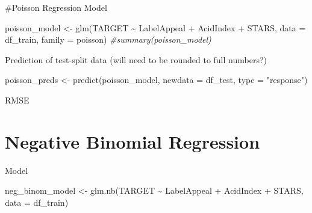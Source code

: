 \documentclass[
]{article}
\newenvironment{Shaded}{\begin{snugshade}}{\end{snugshade}}
\newcommand{\AttributeTok}[1]{\textcolor[rgb]{0.77,0.63,0.00}{#1}}
\newcommand{\CommentTok}[1]{\textcolor[rgb]{0.56,0.35,0.01}{\textit{#1}}}
\newcommand{\DecValTok}[1]{\textcolor[rgb]{0.00,0.00,0.81}{#1}}
\newcommand{\FunctionTok}[1]{\textcolor[rgb]{0.00,0.00,0.00}{#1}}
\newcommand{\NormalTok}[1]{#1}
\newcommand{\OtherTok}[1]{\textcolor[rgb]{0.56,0.35,0.01}{#1}}
\newcommand{\SpecialCharTok}[1]{\textcolor[rgb]{0.00,0.00,0.00}{#1}}
\newcommand{\StringTok}[1]{\textcolor[rgb]{0.31,0.60,0.02}{#1}}
\begin{document}
\#Poisson Regression Model

\begin{Shaded}
\begin{Highlighting}[]
\NormalTok{poisson\_model }\OtherTok{\textless{}{-}} \FunctionTok{glm}\NormalTok{(TARGET }\SpecialCharTok{\textasciitilde{}}\NormalTok{ LabelAppeal }\SpecialCharTok{+}\NormalTok{ AcidIndex }\SpecialCharTok{+}\NormalTok{ STARS, }\AttributeTok{data =}\NormalTok{ df\_train, }\AttributeTok{family =}\NormalTok{ poisson)}
\CommentTok{\#summary(poisson\_model)}
\end{Highlighting}
\end{Shaded}

Prediction of test-split data (will need to be rounded to full numbers?)

\begin{Shaded}
\begin{Highlighting}[]
\NormalTok{poisson\_preds }\OtherTok{\textless{}{-}} \FunctionTok{predict}\NormalTok{(poisson\_model, }\AttributeTok{newdata =}\NormalTok{ df\_test, }\AttributeTok{type =} \StringTok{"response"}\NormalTok{)}
\end{Highlighting}
\end{Shaded}

RMSE

\begin{Shaded}
\end{Shaded}

\hypertarget{negative-binomial-regression}{%
\section{Negative Binomial
Regression}\label{negative-binomial-regression}}

Model

\begin{Shaded}
\begin{Highlighting}[]
\NormalTok{neg\_binom\_model }\OtherTok{\textless{}{-}} \FunctionTok{glm.nb}\NormalTok{(TARGET }\SpecialCharTok{\textasciitilde{}}\NormalTok{ LabelAppeal }\SpecialCharTok{+}\NormalTok{ AcidIndex }\SpecialCharTok{+}\NormalTok{ STARS, }\AttributeTok{data =}\NormalTok{ df\_train)}
\end{Highlighting}
\end{Shaded}
\end{document}

